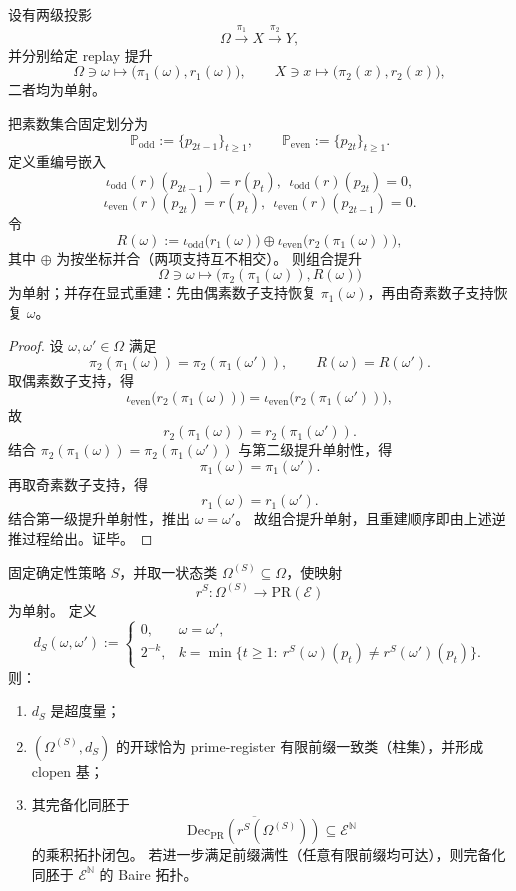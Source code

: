 \begin{theorem}[素数轴分解下的可逆化合成与素数张量积结构]\label{thm:xi-prime-axis-tensorized-replay-composition}
设有两级投影
\[
\Omega\xrightarrow{\ \pi_1\ }X\xrightarrow{\ \pi_2\ }Y,
\]
并分别给定 replay 提升
\[
\Omega\ni\omega\longmapsto\bigl(\pi_1(\omega),r_1(\omega)\bigr),
\qquad
X\ni x\longmapsto\bigl(\pi_2(x),r_2(x)\bigr),
\]
二者均为单射。

把素数集合固定划分为
\[
\mathbb P_{\mathrm{odd}}:=\{p_{2t-1}\}_{t\ge1},
\qquad
\mathbb P_{\mathrm{even}}:=\{p_{2t}\}_{t\ge1}.
\]
定义重编号嵌入
\[
\iota_{\mathrm{odd}}(r)(p_{2t-1})=r(p_t),\ \ \iota_{\mathrm{odd}}(r)(p_{2t})=0,
\]
\[
\iota_{\mathrm{even}}(r)(p_{2t})=r(p_t),\ \ \iota_{\mathrm{even}}(r)(p_{2t-1})=0.
\]
令
\[
R(\omega):=
\iota_{\mathrm{odd}}\!\bigl(r_1(\omega)\bigr)
\oplus
\iota_{\mathrm{even}}\!\bigl(r_2(\pi_1(\omega))\bigr),
\]
其中 \(\oplus\) 为按坐标并合（两项支持互不相交）。
则组合提升
\[
\Omega\ni\omega\longmapsto\bigl(\pi_2(\pi_1(\omega)),R(\omega)\bigr)
\]
为单射；并存在显式重建：先由偶素数子支持恢复 \(\pi_1(\omega)\)，再由奇素数子支持恢复 \(\omega\)。
\end{theorem}

\begin{proof}
设 \(\omega,\omega'\in\Omega\) 满足
\[
\pi_2(\pi_1(\omega))=\pi_2(\pi_1(\omega')),
\qquad
R(\omega)=R(\omega').
\]
取偶素数子支持，得
\[
\iota_{\mathrm{even}}\!\bigl(r_2(\pi_1(\omega))\bigr)
=
\iota_{\mathrm{even}}\!\bigl(r_2(\pi_1(\omega'))\bigr),
\]
故
\[
r_2(\pi_1(\omega))=r_2(\pi_1(\omega')).
\]
结合 \(\pi_2(\pi_1(\omega))=\pi_2(\pi_1(\omega'))\) 与第二级提升单射性，得
\[
\pi_1(\omega)=\pi_1(\omega').
\]
再取奇素数子支持，得
\[
r_1(\omega)=r_1(\omega').
\]
结合第一级提升单射性，推出 \(\omega=\omega'\)。
故组合提升单射，且重建顺序即由上述逆推过程给出。证毕。
\end{proof}

\begin{theorem}\label{thm:xi-prime-register-ultrametric-cylinder-topology}
固定确定性策略 \(S\)，并取一状态类 \(\Omega^{(S)}\subseteq\Omega\)，使映射
\[
r^S:\Omega^{(S)}\to \mathrm{PR}(\mathcal E)
\]
为单射。
定义
\[
d_S(\omega,\omega') :=
\begin{cases}
0, & \omega=\omega',\\[2pt]
2^{-k}, & k=\min\{t\ge1:\ r^S(\omega)(p_t)\neq r^S(\omega')(p_t)\}.
\end{cases}
\]
则：
\begin{enumerate}
  \item \(d_S\) 是超度量；
  \item \((\Omega^{(S)},d_S)\) 的开球恰为 prime-register 有限前缀一致类（柱集），并形成 clopen 基；
  \item 其完备化同胚于
  \[
  \overline{\mathrm{Dec}_{\mathrm{PR}}\!\left(r^S(\Omega^{(S)})\right)}
  \subseteq
  \mathcal E^{\mathbb N}
  \]
  的乘积拓扑闭包。
  若进一步满足前缀满性（任意有限前缀均可达），则完备化同胚于 \(\mathcal E^{\mathbb N}\) 的 Baire 拓扑。
\end{enumerate}
\end{theorem}

